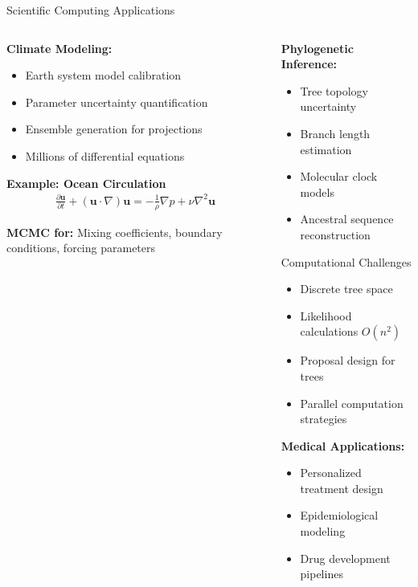 \documentclass[aspectratio=169,11pt]{beamer}
\begin{document}
\begin{frame}{Scientific Computing Applications}
\begin{columns}
\begin{column}{0.5\textwidth}
\textbf{Climate Modeling:}
\begin{itemize}
\item Earth system model calibration
\item Parameter uncertainty quantification
\item Ensemble generation for projections
\item Millions of differential equations
\end{itemize}

\textbf{Example: Ocean Circulation}
\begin{align}
\frac{\partial \mathbf{u}}{\partial t} + (\mathbf{u} \cdot \nabla)\mathbf{u} = -\frac{1}{\rho}\nabla p + \nu \nabla^2 \mathbf{u}
\end{align}

\textbf{MCMC for:} Mixing coefficients, boundary conditions, forcing parameters
\end{column}
\begin{column}{0.5\textwidth}
\textbf{Phylogenetic Inference:}
\begin{itemize}
\item Tree topology uncertainty
\item Branch length estimation
\item Molecular clock models
\item Ancestral sequence reconstruction
\end{itemize}

\begin{block}{Computational Challenges}
\begin{itemize}
\item Discrete tree space
\item Likelihood calculations $O(n^2)$
\item Proposal design for trees
\item Parallel computation strategies
\end{itemize}
\end{block}

\vspace{0.3cm}
\textbf{Medical Applications:}
\begin{itemize}
\item Personalized treatment design
\item Epidemiological modeling
\item Drug development pipelines
\end{itemize}
\end{column}
\end{columns}
\end{frame}
\end{document}
